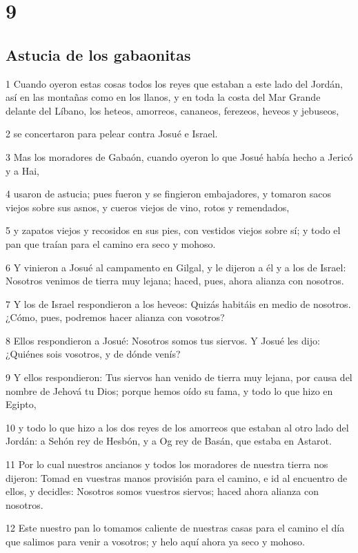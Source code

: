 \chapter{9}

\section*{Astucia de los gabaonitas}

\par 1 Cuando oyeron estas cosas todos los reyes que estaban a este lado del Jordán, así en las montañas como en los llanos, y en toda la costa del Mar Grande delante del Líbano, los heteos, amorreos, cananeos, ferezeos, heveos y jebuseos,
\par 2 se concertaron para pelear contra Josué e Israel.
\par 3 Mas los moradores de Gabaón, cuando oyeron lo que Josué había hecho a Jericó y a Hai,
\par 4 usaron de astucia; pues fueron y se fingieron embajadores, y tomaron sacos viejos sobre sus asnos, y cueros viejos de vino, rotos y remendados,
\par 5 y zapatos viejos y recosidos en sus pies, con vestidos viejos sobre sí; y todo el pan que traían para el camino era seco y mohoso.
\par 6 Y vinieron a Josué al campamento en Gilgal, y le dijeron a él y a los de Israel: Nosotros venimos de tierra muy lejana; haced, pues, ahora alianza con nosotros.
\par 7 Y los de Israel respondieron a los heveos: Quizás habitáis en medio de nosotros. ¿Cómo, pues, podremos hacer alianza con vosotros?
\par 8 Ellos respondieron a Josué: Nosotros somos tus siervos. Y Josué les dijo: ¿Quiénes sois vosotros, y de dónde venís?
\par 9 Y ellos respondieron: Tus siervos han venido de tierra muy lejana, por causa del nombre de Jehová tu Dios; porque hemos oído su fama, y todo lo que hizo en Egipto,
\par 10 y todo lo que hizo a los dos reyes de los amorreos que estaban al otro lado del Jordán: a Sehón rey de Hesbón, y a Og rey de Basán, que estaba en Astarot. 
\par 11 Por lo cual nuestros ancianos y todos los moradores de nuestra tierra nos dijeron: Tomad en vuestras manos provisión para el camino, e id al encuentro de ellos, y decidles: Nosotros somos vuestros siervos; haced ahora alianza con nosotros.
\par 12 Este nuestro pan lo tomamos caliente de nuestras casas para el camino el día que salimos para venir a vosotros; y helo aquí ahora ya seco y mohoso.
